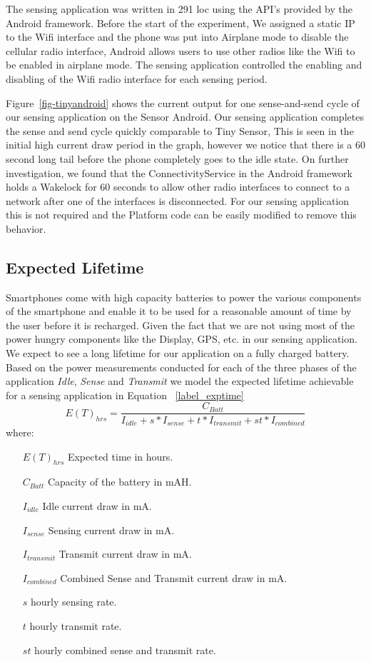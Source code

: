 The sensing application was written in 291 loc using the API's provided by the Android framework. 
Before the start of the experiment, We assigned a static IP to the Wifi interface and the phone was put into Airplane mode to 
disable the cellular radio interface, Android allows users to use other radios like the Wifi to be enabled in airplane mode.
The sensing application controlled the enabling and disabling of the Wifi radio interface for each sensing period.

Figure~\ref{fig-tinyandroid} shows the current output for one sense-and-send cycle of our 
sensing application on the Sensor Android. Our sensing application completes the sense and 
send cycle quickly comparable to Tiny Sensor, This is seen in the initial high current draw period 
in the graph, however we notice that there is a 60 second long tail before
the phone completely goes to the idle state. On further investigation, we found that the 
ConnectivityService in the Android framework holds a Wakelock for 60 seconds to allow other 
radio interfaces to connect  to a network after one of the interfaces is disconnected. 
For our sensing application this is not required and the Platform code can be easily modified to remove this behavior.

\subsection{Expected Lifetime}
Smartphones come with high capacity batteries to power the various components of the smartphone and enable it to be used for a reasonable amount of time by the user before it is recharged. Given the fact that we are not using most of the power hungry components like the Display, GPS, etc. in our sensing application. We expect to see a long lifetime for our application on a fully charged battery. Based on the power measurements conducted for each of the three phases of the application \textit{Idle}, \textit{Sense} and \textit{Transmit} we model the expected lifetime achievable for a sensing application in Equation ~\ref{label_exptime} 
\begin{equation}\label{label_exptime}
    E(T)_{hrs} = \frac{C_{Batt}}{I_{idle} + s*I_{sense} + t*I_{transmit} + st*I_{combined}}
\end{equation}
where:
\begin{itemize}
    \item[$E(T)_{hrs}$] Expected time in hours.
    \item[$C_{Batt}$] Capacity of the battery in mAH.
    \item[$I_{idle}$] Idle current draw in mA.
    \item[$I_{sense}$] Sensing current draw in mA.
    \item[$I_{transmit}$] Transmit current draw in mA.
    \item[$I_{combined}$] Combined Sense and Transmit current draw in mA.
    \item[$s$] hourly sensing rate.
    \item[$t$] hourly transmit rate.
    \item[$st$] hourly combined sense and transmit rate.
\end{itemize}

